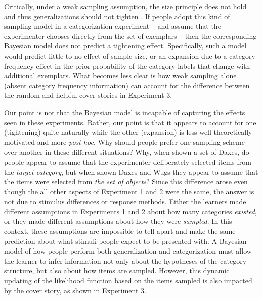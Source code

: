 \documentclass[doc,apacite]{apa6}
\begin{document}
Critically, under a weak sampling assumption, the size principle does not hold and thus generalizations should not tighten \cite{tenenbaum2001generalization,tenenbaum1999bayesian}. If people adopt this kind of sampling model in a categorization experiment -- and assume that the experimenter chooses directly from the set of exemplars -- then the corresponding Bayesian model does not predict a tightening effect. Specifically, such a model would predict little to no effect of sample size, or an expansion due to a category frequency effect in the prior probability of the category labels that change with additional exemplars.
What becomes less clear is how weak sampling alone (absent category frequency information) can account for the difference between the random and helpful cover stories in Experiment 3.

Our point is not that the Bayesian model is incapable of capturing the effects seen in these experiments. Rather, our point is that it appears to account for one (tightening) quite naturally while the other (expansion) is less well theoretically motivated and more {\it post hoc}. Why should people prefer one sampling scheme over another in these different situations? Why, when shown a set of Daxes, do people appear to assume that the experimenter deliberately selected items from the {\it target category}, but when shown Daxes and Wugs they appear to assume that the items were selected from {\it the set of objects}? Since this difference arose even though the all other aspects of Experiment 1 and 2 were the same, the answer is not due to stimulus differences or response methods. Either the learners made different assumptions in Experiments 1 and 2 about how many categories {\it existed}, or they made different assumptions about how they were {\it sampled}. In this context, these assumptions are impossible to tell apart and make the same prediction about what stimuli people expect to be presented with. A Bayesian model of how people perform both generalization and categorization must allow the learner to infer information not only about the hypotheses of the category structure, but also about how items are sampled. However, this dynamic updating of the likelihood function based on the items sampled is also impacted by the cover story, as shown in Experiment 3.

\end{document}
